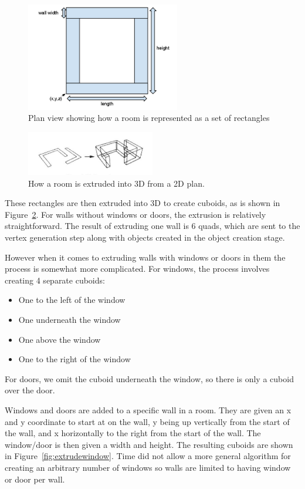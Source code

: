 \begin{figure}
  \centering
  \includegraphics[width=0.6\textwidth]{images/planextrusion}
  \caption{Plan view showing how a room is represented as a set of rectangles}
  \label{fig:planext}
\end{figure}

\begin{figure}
  \centering
  \includegraphics[width=0.5\textwidth]{images/wallextrusion2}
  \caption{How a room is extruded into 3D from a 2D plan.}
  \label{fig:extrusion}
\end{figure}

These rectangles are then extruded into 3D to create cuboids, as is shown in Figure~\ref{fig:extrusion}.
For walls without windows or doors, the extrusion is relatively straightforward.
The result of extruding one wall is 6 quads, which are sent to the vertex generation step along with objects created in the object creation stage.

However when it comes to extruding walls with windows or doors in them the process is somewhat more complicated.
For windows, the process involves creating 4 separate cuboids:
\begin{itemize}
	\item One to the left of the window
	\item One underneath the window
	\item One above the window
	\item One to the right of the window
\end{itemize}
For doors, we omit the cuboid underneath the window, so there is only a cuboid over the door.

Windows and doors are added to a specific wall in a room.
They are given an x and y coordinate to start at on the wall, y being up vertically from the start of the wall, and x horizontally to the right from the start of the wall.
The window/door is then given a width and height.
The resulting cuboids are shown in Figure~\ref{fig:extrudewindow}.
Time did not allow a more general algorithm for creating an arbitrary number of windows so walls are limited to having window or door per wall.

